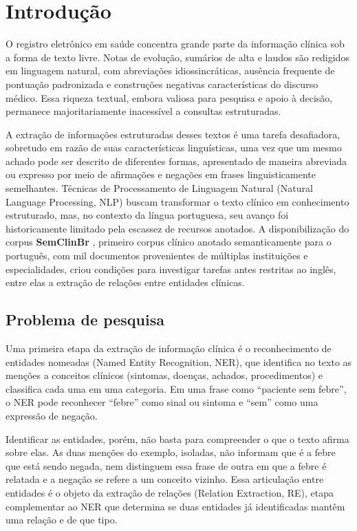 \chapter[Introdução]{Introdução}
\label{cap:introducao}

O registro eletrônico em saúde concentra grande parte da informação clínica
sob a forma de texto livre. Notas de evolução, sumários de alta e laudos são
redigidos em linguagem natural, com abreviações idiossincráticas, ausência
frequente de pontuação padronizada e construções negativas características do
discurso médico. Essa riqueza textual, embora valiosa para pesquisa e apoio à
decisão, permanece majoritariamente inacessível a consultas estruturadas.

A extração de informações estruturadas desses textos é uma tarefa desafiadora, sobretudo em razão de suas características linguísticas, uma vez que um mesmo achado pode ser descrito de diferentes formas, apresentado de maneira abreviada ou expresso por meio de afirmações e negações em frases linguisticamente semelhantes. Técnicas de Processamento de Linguagem Natural (\foreignlanguage{english}{Natural Language Processing}, NLP) buscam transformar o texto clínico em conhecimento estruturado, mas, no
contexto da língua portuguesa, seu avanço foi historicamente limitado pela escassez
de recursos anotados. A disponibilização do corpus \textbf{SemClinBr}
\cite{oliveira_2022_semclinbr}, primeiro corpus clínico anotado semanticamente para o
português, com mil documentos provenientes de múltiplas instituições e
especialidades, criou condições para investigar tarefas antes restritas ao inglês,
entre elas a extração de relações entre entidades clínicas.

\section{Problema de pesquisa}

Uma primeira etapa da extração de informação clínica é o reconhecimento de entidades
nomeadas (\foreignlanguage{english}{Named Entity Recognition}, NER), que identifica
no texto as menções a conceitos clínicos (sintomas, doenças, achados,
procedimentos) e classifica cada uma em uma categoria. Em uma frase como ``paciente
sem febre'', o NER pode reconhecer ``febre'' como sinal ou sintoma e ``sem'' como uma
expressão de negação.

Identificar as entidades, porém, não basta para compreender o que o texto afirma
sobre elas. As duas menções do exemplo, isoladas, não informam que é a febre que está
sendo negada, nem distinguem essa frase de outra em que a febre é relatada e a
negação se refere a um conceito vizinho. Essa articulação entre entidades é o objeto
da extração de relações (\foreignlanguage{english}{Relation Extraction}, RE), etapa
complementar ao NER que determina se duas entidades já identificadas mantêm uma
relação e de que tipo.

